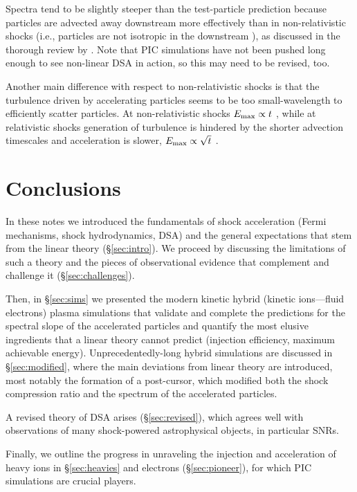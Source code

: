 \documentclass[varenna]{cimento}
\begin{document}
Spectra tend to be slightly steeper than the test-particle prediction because particles are advected away downstream more effectively than in non-relativistic shocks (i.e., particles are not isotropic in the downstream \cite{blasi-vietri05, morlino+07a, morlino+07b}), as discussed in the thorough review by \cite{jones+91}.
Note that PIC simulations have not been pushed long enough to see non-linear DSA in action, so this may need to be revised, too.

Another main difference with respect to non-relativistic shocks is that the turbulence driven by accelerating particles seems to be too small-wavelength to efficiently scatter particles.
At non-relativistic shocks $E_{\rm max}\propto t$ \cite{park+15}, while at relativistic shocks generation of turbulence is hindered by the shorter advection timescales and acceleration is slower, $E_{\rm max}\propto \sqrt{t}$ \cite{sironi+13}.

\section{Conclusions}
In these notes we introduced the fundamentals of shock acceleration (Fermi mechanisms, shock hydrodynamics, DSA) and the general expectations that stem from the linear theory (\S\ref{sec:intro}).
We proceed by discussing the limitations of such a theory and the pieces of observational evidence that complement and challenge it (\S\ref{sec:challenges}).

Then, in \S\ref{sec:sims} we presented the modern kinetic hybrid (kinetic ions---fluid electrons) plasma simulations that validate and complete the predictions for the spectral slope of the accelerated particles and quantify the most elusive ingredients that a linear theory cannot predict (injection efficiency, maximum achievable energy).
Unprecedentedly-long hybrid simulations are discussed in \S\ref{sec:modified}, where the main deviations from linear theory are introduced, most notably the formation of a post-cursor, which modified both the shock compression ratio and the spectrum of the accelerated particles.

A revised theory of DSA arises (\S\ref{sec:revised}), which agrees well with observations of many shock-powered astrophysical objects, in particular SNRs.

Finally, we outline the progress in unraveling the injection and acceleration of heavy ions in \S\ref{sec:heavies} and electrons (\S\ref{sec:pioneer}), for which PIC simulations are crucial players.
\end{document}
